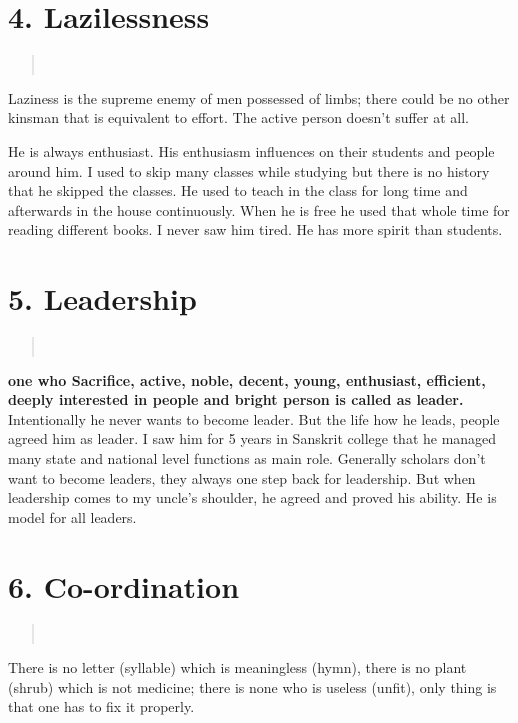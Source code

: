 \section*{4. Lazilessness }
\begin{verse}
\\
\end{verse}
Laziness is the supreme enemy of men possessed of limbs; there could be no other kinsman that is equivalent to effort. The active person doesn’t suffer at all.

He is always enthusiast. His enthusiasm influences on their students and people around him. I used to skip many classes while studying but there is no history that he skipped the classes. He used to teach in the class for long time and afterwards in the house continuously. When he is free he used that whole time for reading different books. I never saw him tired. He has more spirit than students.

\section*{5. Leadership }
\begin{verse}
\\
\end{verse}
\textbf{one who Sacrifice, active, noble, decent, young, enthusiast, efficient, deeply interested in people and bright person is called as leader.}
Intentionally he never wants to become leader. But the life how he leads, people agreed him as leader. I saw him for 5 years in Sanskrit college that he managed many state and national level functions as main role. Generally scholars don’t want to become leaders, they always one step back for leadership. But when leadership comes to my uncle’s shoulder, he agreed and proved his ability. He is model for all leaders.

\section*{6. Co-ordination }
\begin{verse}
\\
\end{verse}
There is no letter (syllable) which is meaningless (hymn), there is no plant (shrub) which is not medicine; there is none who is useless (unfit), only thing is that one has to fix it properly.

